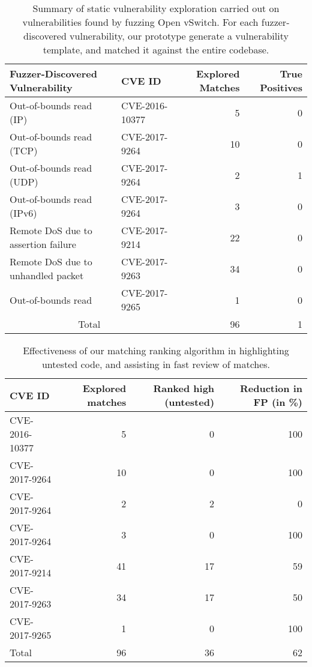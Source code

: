 \begin{table*}[!tbh]
  \centering
  \begin{tabular}{p{6cm}lrr}
  \toprule
  Fuzzer-Discovered Vulnerability & CVE ID & Explored Matches & True Positives \\
  \toprule
 Out-of-bounds read (IP) & CVE-2016-10377~\cite{cve201610377} & 5 & 0 \\
 Out-of-bounds read (TCP) & CVE-2017-9264~\cite{cve20179264}  & 10 & 0 \\
 Out-of-bounds read (UDP) & CVE-2017-9264 & 2 & 1 \\
 Out-of-bounds read (IPv6)& CVE-2017-9264 & 3 & 0 \\
 Remote DoS due to assertion failure & CVE-2017-9214~\cite{cve20179214} & 22 & 0 \\
 Remote DoS due to unhandled packet & CVE-2017-9263~\cite{cve20179263} & 34 & 0 \\
 Out-of-bounds read & CVE-2017-9265~\cite{cve20179265} & 1 & 0 \\
  \bottomrule
  \multicolumn{2}{c}{Total} & 96 & 1 \\
  \bottomrule
  \end{tabular}
  \caption{Summary of static vulnerability exploration carried out on vulnerabilities found by fuzzing Open vSwitch. For each fuzzer-discovered vulnerability, our prototype generate a vulnerability template, and matched it against the entire codebase.}
  \label{tab:matches}
\end{table*}

\begin{table*}[!tbh]
  \centering
  \begin{tabular}{lrrr}
  \toprule
  CVE ID & Explored matches & Ranked high (untested) & Reduction in FP (in \%)\\
  \toprule
  CVE-2016-10377 & 5 & 0 & 100\\
  CVE-2017-9264  & 10 & 0 & 100 \\
  CVE-2017-9264 & 2 & 2 & 0 \\
  CVE-2017-9264 & 3 & 0 & 100 \\
  CVE-2017-9214 & 41 & 17 & 59 \\
  CVE-2017-9263 & 34 & 17 & 50 \\
  CVE-2017-9265 & 1 & 0 & 100 \\
  \bottomrule
  Total & 96 & 36 & 62 \\
  \bottomrule
  \end{tabular}
  \caption{Effectiveness of our matching ranking algorithm in highlighting untested code, and assisting in fast review of matches.}
  \label{tab:ranking}
\end{table*}

